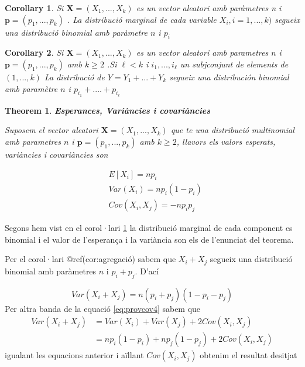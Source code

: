 \documentclass[
  catalan,
]{article}
\newtheorem{theorem}{Theorem}[section]
\newtheorem{corollary}{Corollary}[section]
\theoremstyle{definition}
\theoremstyle{definition}
\theoremstyle{definition}
\theoremstyle{definition}
\theoremstyle{remark}
\begin{document}
\begin{corollary}
\protect\hypertarget{cor:binomial}{}\label{cor:binomial}Si \(\mathbf{X}=(X_1,...,X_k)\) es un vector aleatori amb paràmetres n i \(\mathbf{p}=(p_1,...,p_k)\) . La distribució marginal de cada variable \(X_i,i=1,...,k)\) segueix una distribució binomial amb paràmetre \(n\) i \(p_i\)
\end{corollary}

\begin{corollary}
\protect\hypertarget{cor:agregacio}{}\label{cor:agregacio}Si \(\mathbf{X}=(X_1,...,X_k)\) es un vector aleatori amb parametres \(n\) i \(\mathbf{p}=(p_1,...,p_k)\) amb \(k \geq 2\) .Si \(\ell<k\) i \(i_1,...,i_{\ell}\) un subjconjunt de elements de \((1,...,k)\) La distribució de \(Y=Y_1+...+Y_k\) segueix una distribución binomial amb paramètre \(n\) i \(p_{i_1}+  ....+p_{i_\ell}\)
\end{corollary}

\begin{theorem}
\textbf{Esperances, Variàncies i covariàncies}

Suposem el vector aleatori \(\mathbf{X}=(X_1,...,X_k)\) que te una distribució multinomial amb parametres \(n\) i \(\mathbf{p}=(p_1,...,p_k)\) amb \(k \geq 2\), llavors els valors esperats, variàncies i covariàncies son

\[
\begin{aligned}
& E[X_i]= np_i \\
& Var(X_i)=np_i (1-p_i) \\
& Cov(X_i,X_j)=-np_ip_j 
\end{aligned}
\]
\end{theorem}

Segons hem vist en el corol·lari \ref{cor:binomial} la distribució marginal de cada component es binomial i el valor de l'esperança i la variància son els de l'enunciat del teorema.

Per el corol·lari @ref(cor:agregació) sabem que \(X_i+X_j\) segueix una distribució binomial amb paràmetres \(n\) i \(p_i+p_j\). D'ací

\[
Var(X_i+X_j)=n(p_i+p_j)(1-p_i-p_j)
\]
Per altra banda de la equació \eqref{eq:provcov4} sabem que
\[
\begin{aligned} 
Var(X_i+X_j)&=Var(X_i)+Var(X_j)+2Cov(X_i,X_j) \\
&=np_i(1-p_i)+ np_j(1-p_j)+2Cov(X_i,X_j)
\end{aligned}
\]
igualant les equacions anterior i aïllant \(Cov(X_i, X_j)\) obtenim el resultat desitjat
\end{document}
